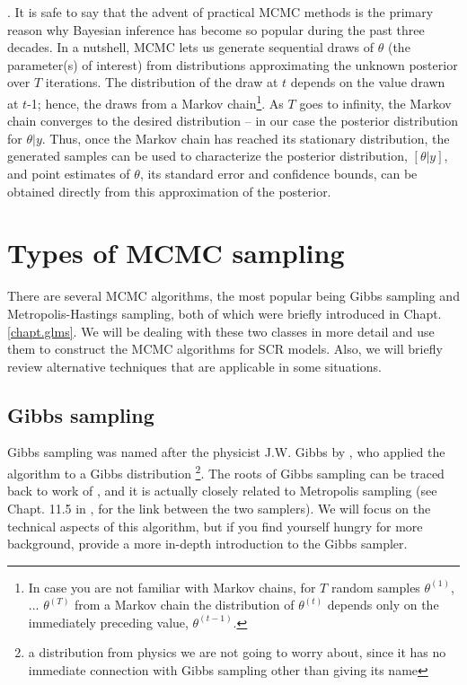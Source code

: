 \citep{gelfand_smith:1990}. It is safe to say that the advent of
practical MCMC methods is the primary reason why Bayesian inference
has become so popular during the past three decades.
In a nutshell, MCMC lets us generate sequential draws of $\theta$ (the
parameter(s) of interest) from distributions approximating the unknown
posterior over $T$ iterations. The distribution of the draw at $t$ depends
on the value drawn at $t$-1; hence, the draws from a Markov
chain\footnote{In case you are not familiar with Markov chains, for
  $T$ random samples $\theta^ {(1)}$, ... $\theta^{(T)}$ from a Markov chain
  the distribution of $\theta^{(t)}$ depends only on the immediately preceding
  value, $\theta^{(t-1)}$.}. As $T$ goes to infinity, the Markov chain
converges to the desired distribution – in our case the posterior
distribution for $\theta|y$. Thus, once the Markov chain has reached
its stationary distribution, the generated samples can be used to
characterize the posterior distribution, $[\theta|y]$, and point
estimates of $\theta$, its standard error and confidence bounds, can
be obtained directly from this approximation of the posterior. 



\section{Types of MCMC sampling}

There are several MCMC algorithms, the most popular being Gibbs
sampling and Metropolis-Hastings sampling, both of which were briefly introduced in Chapt. \ref{chapt.glms}. We will be dealing with
these two classes in more detail and use them to construct the MCMC
algorithms for SCR models. Also, we will briefly review alternative
techniques that are applicable in some situations.


\subsection{Gibbs sampling}
\label{mcmc.sec.gibbs}

Gibbs sampling was named after the physicist J.W. Gibbs by
\citet{geman_geman:1984}, who applied the algorithm to a Gibbs
distribution \footnote{a distribution from physics we are not going to
  worry about, since it has no immediate connection with Gibbs
  sampling other than giving its name}. The roots of Gibbs sampling
can be traced back to work of \citet{metropolis_ulam:1953}, and it is
actually closely related to Metropolis sampling (see Chapt. 11.5 in
\citet{gelman_etal:2004}, for the link between the two samplers). We
will focus on the technical aspects of this algorithm, but if you find
yourself hungry for more background, \citet{casella_george:1992}
provide a more in-depth introduction to the Gibbs sampler.

